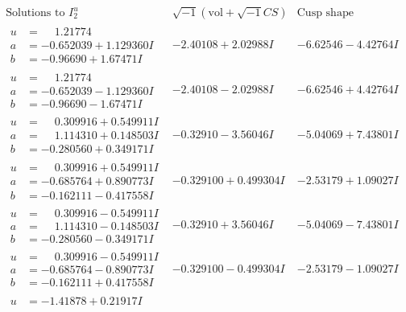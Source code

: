 \documentclass[1p]{elsarticle_modified}
\theoremstyle{definition}
\newcommand{\I}{\sqrt{-1}}
\begin{document}
$$\begin{array}{c|c|c}  
\text{Solutions to }I^u_{2}& \I (\text{vol} + \sqrt{-1}CS) & \text{Cusp shape}\\
 \hline 
\begin{aligned}
u &= \phantom{-}1.21774\phantom{ +0.000000I} \\
a &= -0.652039 + 1.129360 I \\
b &= -0.96690 + 1.67471 I\end{aligned}
 & -2.40108 + 2.02988 I & -6.62546 - 4.42764 I \\ \hline\begin{aligned}
u &= \phantom{-}1.21774\phantom{ +0.000000I} \\
a &= -0.652039 - 1.129360 I \\
b &= -0.96690 - 1.67471 I\end{aligned}
 & -2.40108 - 2.02988 I & -6.62546 + 4.42764 I \\ \hline\begin{aligned}
u &= \phantom{-}0.309916 + 0.549911 I \\
a &= \phantom{-}1.114310 + 0.148503 I \\
b &= -0.280560 + 0.349171 I\end{aligned}
 & -0.32910 - 3.56046 I & -5.04069 + 7.43801 I \\ \hline\begin{aligned}
u &= \phantom{-}0.309916 + 0.549911 I \\
a &= -0.685764 + 0.890773 I \\
b &= -0.162111 - 0.417558 I\end{aligned}
 & -0.329100 + 0.499304 I & -2.53179 + 1.09027 I \\ \hline\begin{aligned}
u &= \phantom{-}0.309916 - 0.549911 I \\
a &= \phantom{-}1.114310 - 0.148503 I \\
b &= -0.280560 - 0.349171 I\end{aligned}
 & -0.32910 + 3.56046 I & -5.04069 - 7.43801 I \\ \hline\begin{aligned}
u &= \phantom{-}0.309916 - 0.549911 I \\
a &= -0.685764 - 0.890773 I \\
b &= -0.162111 + 0.417558 I\end{aligned}
 & -0.329100 - 0.499304 I & -2.53179 - 1.09027 I \\ \hline\begin{aligned}
u &= -1.41878 + 0.21917 I \\

\end{aligned}
\end{array}$$
\end{document}
